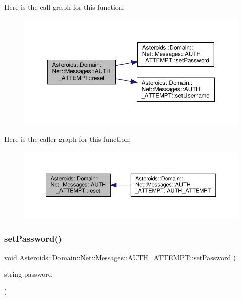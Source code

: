 Here is the call graph for this function\+:\nopagebreak
\begin{figure}[H]
\begin{center}
\leavevmode
\includegraphics[width=350pt]{classAsteroids_1_1Domain_1_1Net_1_1Messages_1_1AUTH__ATTEMPT_ac3d3b7f2f68f6738cf34d34f5cc6eaf9_cgraph}
\end{center}
\end{figure}
Here is the caller graph for this function\+:\nopagebreak
\begin{figure}[H]
\begin{center}
\leavevmode
\includegraphics[width=350pt]{classAsteroids_1_1Domain_1_1Net_1_1Messages_1_1AUTH__ATTEMPT_ac3d3b7f2f68f6738cf34d34f5cc6eaf9_icgraph}
\end{center}
\end{figure}
\mbox{\label{classAsteroids_1_1Domain_1_1Net_1_1Messages_1_1AUTH__ATTEMPT_ab05c3f631e0ac62fdefe27e95b5066a2}} 
\subsubsection{\texorpdfstring{set\+Password()}{setPassword()}}
{\footnotesize\ttfamily void Asteroids\+::\+Domain\+::\+Net\+::\+Messages\+::\+A\+U\+T\+H\+\_\+\+A\+T\+T\+E\+M\+P\+T\+::set\+Password (\begin{DoxyParamCaption}\item[{string}]{password }\end{DoxyParamCaption})}



